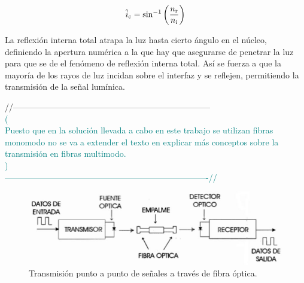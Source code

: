 	\begin{equation}
		\label{eq:angCritico}
		\hat{i}\textsubscript{c} =  \sin^{-1}\left(\dfrac{n\textsubscript{r}}{n\textsubscript{i}}\right)
	\end{equation}

 La reflexión interna total atrapa la luz hasta cierto ángulo en el núcleo, definiendo la apertura numérica a la que hay que asegurarse de penetrar la luz para que se de el fenómeno de reflexión interna total. Así se fuerza a que la mayoría de los rayos de luz incidan sobre el interfaz y se reflejen, permitiendo la transmisión de la señal lumínica. 
 
 
 \textcolor{rositaoscuro}{//----------------------------------------------------------------------- }\\ 
 \textcolor{teal}{(\\Puesto que en la solución llevada a cabo en este trabajo se utilizan fibras monomodo no se va a extender el texto en explicar más conceptos sobre la transmisión en fibras multimodo.\\)\\
 \textcolor{rositaoscuro}{-------------------------------------------------------------------------//}\\}
 
 
   \begin{figure}[H]
 	\centering
 	\includegraphics[width=1\textwidth]{./img/TxFOp2p}
 	\caption{Transmisión punto a punto de señales a través de fibra óptica. \cite{txFO} } 
 	\label{fig:TxFOp2p}
 \end{figure} 
 
